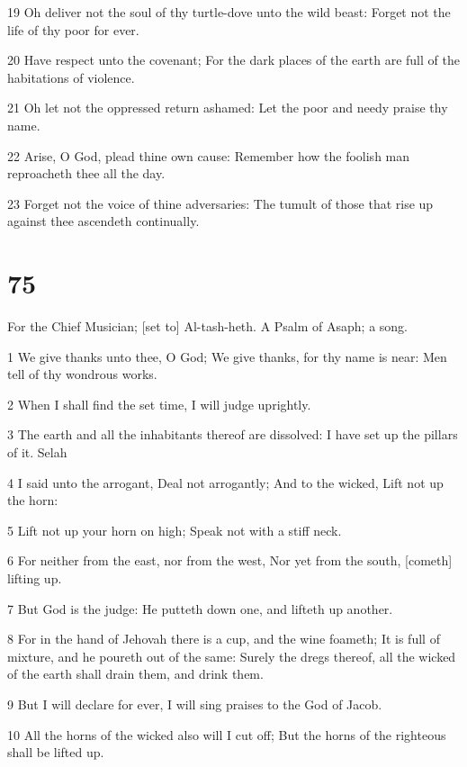 \par 19 Oh deliver not the soul of thy turtle-dove unto the wild beast: Forget not the life of thy poor for ever.
\par 20 Have respect unto the covenant; For the dark places of the earth are full of the habitations of violence.
\par 21 Oh let not the oppressed return ashamed: Let the poor and needy praise thy name.
\par 22 Arise, O God, plead thine own cause: Remember how the foolish man reproacheth thee all the day.
\par 23 Forget not the voice of thine adversaries: The tumult of those that rise up against thee ascendeth continually.

\chapter{75}

\par For the Chief Musician; [set to] Al-tash-heth. A Psalm of Asaph; a song.

\par 1 We give thanks unto thee, O God; We give thanks, for thy name is near: Men tell of thy wondrous works.
\par 2 When I shall find the set time, I will judge uprightly.
\par 3 The earth and all the inhabitants thereof are dissolved: I have set up the pillars of it. Selah
\par 4 I said unto the arrogant, Deal not arrogantly; And to the wicked, Lift not up the horn:
\par 5 Lift not up your horn on high; Speak not with a stiff neck.
\par 6 For neither from the east, nor from the west, Nor yet from the south, [cometh] lifting up.
\par 7 But God is the judge: He putteth down one, and lifteth up another.
\par 8 For in the hand of Jehovah there is a cup, and the wine foameth; It is full of mixture, and he poureth out of the same: Surely the dregs thereof, all the wicked of the earth shall drain them, and drink them.
\par 9 But I will declare for ever, I will sing praises to the God of Jacob.
\par 10 All the horns of the wicked also will I cut off; But the horns of the righteous shall be lifted up.

